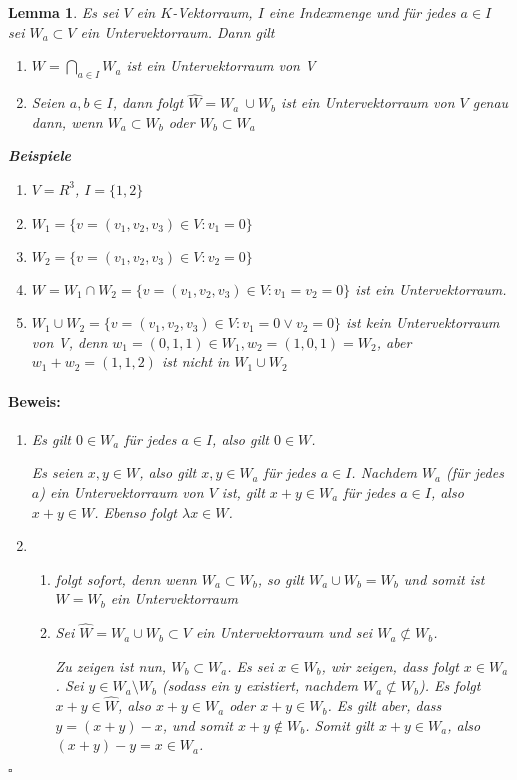 \documentclass{report}
\newcommand{\lb}{\lambda}
\theoremstyle{customrem}
\theoremstyle{customdef}
\newtheorem{lemma}[definition]{Lemma}
\renewenvironment{proof}{\vspace{-.75cm}\paragraph{Beweis: }}{\vspace{-.5cm}\hfill$\square$}
\begin{document}
	\begin{lemma}
		Es sei $V$ ein $K$-Vektorraum, $I$ eine Indexmenge und für jedes $a \in I$ sei $W_a \subset V$ ein Untervektorraum. Dann gilt
		\begin{enumerate}
			\item $W = \bigcap_{a \in I} W_a$ ist ein Untervektorraum von V
			\item Seien $a, b \in I$, dann folgt $\hat{W} = W_a \ \cup W_b$ ist ein Untervektorraum von $V$ genau dann, wenn $W_a \subset W_b$ oder $W_b \subset W_a$
		\end{enumerate}
		\textbf{Beispiele}
		\begin{enumerate}
			\itemsep0cm 
			\item $V = R^3$, $I = \{1, 2\}$
			\item $W_1 = \{v = (v_1, v_2, v_3) \in V : v_1 = 0\}$
			\item $W_2 = \{v = (v_1, v_2, v_3) \in V : v_2 = 0\}$
			\item $W = W_1 \cap W_2 = \{v = (v_1, v_2, v_3) \in V : v_1 = v_2 = 0\}$ ist ein Untervektorraum.
			\item $W_1 \cup W_2 = \{v = (v_1, v_2, v_3) \in V : v_1 = 0 \lor v_2 = 0\}$ ist kein Untervektorraum von V, denn $w_1 = (0, 1, 1) \in W_1, w_2 = (1, 0, 1) = W_2$, aber $w_1 + w_2 = (1, 1, 2)$ ist nicht in $W_1 \cup W_2$
		\end{enumerate}
		\vspace{.25cm}
		\begin{proof}
			\begin{enumerate}
				\item Es gilt $0 \in W_a$ für jedes $a \in I$, also gilt $0 \in W$.
				
				Es seien $x, y \in W$, also gilt $x, y \in W_a$ für jedes $a \in I$. Nachdem $W_a$ (für jedes $a$) ein Untervektorraum von $V$ ist, gilt $x + y \in W_a$ für jedes $a \in I$, also $x + y \in W$. Ebenso folgt $\lb x \in W$.
				\item 
				\begin{enumerate}
					\item["`$\Leftarrow$"'] folgt sofort, denn wenn $W_a \subset W_b$, so gilt $W_a \cup W_b = W_b$ und somit ist $W = W_b$ ein Untervektorraum
					\item["`$\Rightarrow$"']  Sei $\hat{W} = W_a \cup W_b \subset V$ ein Untervektorraum und sei $W_a \not\subset W_b$.
					
					 Zu zeigen ist nun, $W_b \subset W_a$. Es sei $x \in W_b$, wir zeigen, dass folgt $x \in W_a$. Sei $y \in W_a \setminus W_b$ (sodass ein $y$ existiert, nachdem $W_a \not\subset W_b$). Es folgt $x + y \in \hat{W}$, also $x + y \in W_a$ oder $x + y \in W_b$. Es gilt aber, dass $y = (x + y) - x$, und somit $x + y\not\in W_b$. Somit gilt $x + y \in W_a$, also $(x + y) - y = x \in W_a$.
				\end{enumerate}
			\end{enumerate}
		\end{proof}		
	\end{lemma}
	
\end{document}
